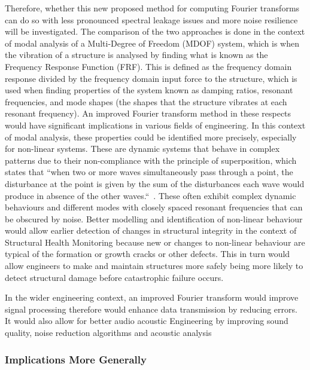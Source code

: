 \documentclass[12pt]{article}
\begin{document}
    Therefore, whether this new proposed method for computing Fourier transforms can do so with less pronounced spectral leakage issues and more noise resilience will be investigated.
    The comparison of the two approaches is done in the context of modal analysis of a Multi-Degree of Freedom (MDOF) system, which is when the vibration of a structure is analysed by finding what is known as the Frequency Response Function (FRF). This is defined as the frequency domain response divided by the frequency domain input force to the structure, which is used when finding properties of the system known as damping ratios, resonant frequencies, and mode shapes (the shapes that the structure vibrates at each resonant frequency).
    An improved Fourier transform method in these respects would have significant implications in various fields of engineering.
    In this context of modal analysis, these properties could be identified more precisely, especially for non-linear systems.
    These are dynamic systems that behave in complex patterns due to their non-compliance with the principle of superposition, which states that ``when two or more waves simultaneously pass through a point, the disturbance at the point is given by the sum of the disturbances each wave would produce in absence of the other waves.``~\cite{StudyComSuperposition}.
    These often exhibit complex dynamic behaviours and different modes with closely spaced resonant frequencies that can be obscured by noise.
    Better modelling and identification of non-linear behaviour would allow earlier detection of changes in structural integrity in the context of Structural Health Monitoring because new or changes to non-linear behaviour are typical of the formation or growth cracks or other defects.
    This in turn would allow engineers to make and maintain structures more safely being more likely to detect structural damage before catastrophic failure occurs.

    In the wider engineering context, an improved Fourier transform would improve signal processing therefore would enhance data transmission by reducing errors.
    It would also allow for better audio acoustic Engineering by improving sound quality, noise reduction algorithms and acoustic analysis

    \subsubsection{Implications More Generally}
\end{document}
